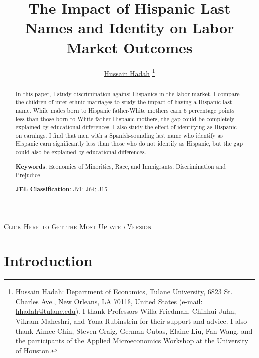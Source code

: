 \documentclass[12pt,english]{article}
\begin{document}
\title{The Impact of Hispanic Last Names and Identity on Labor Market Outcomes}

\author{\href{https://hussainhadah.com/}{Hussain Hadah} \thanks{Hussain Hadah: Department of Economics, Tulane University, 6823 St. Charles Ave., New Orleans, LA 70118, United States (e-mail: \href{mailto:hhadah@tulane.edu}{hhadah@tulane.edu}). I thank Professors Willa Friedman, Chinhui Juhn, Vikram Maheshri, and Yona Rubinstein for their support and advice. I also thank Aimee Chin, Steven Craig, German Cubas, Elaine Liu, Fan Wang, and the participants of the Applied Microeconomics Workshop at the University of Houston.}}


\maketitle

\begin{center}
\href{https://hhadah.github.io/hispanic-last-names/my_paper/Hadah-last-names-draft.pdf}{\textcolor{green!15!black!30!blue}{\footnotesize{\textsc{Click Here to Get the Most Updated Version}}}}
\end{center}

\begin{abstract}
\singlespacing In this paper, I study discrimination against Hispanics in the labor market. I compare the children of inter-ethnic marriages to study the impact of having a Hispanic last name. While males born to Hispanic father-White mothers earn 6 percentage points less than those born to White father-Hispanic mothers, the gap could be completely explained by educational differences. I also study the effect of identifying as Hispanic on earnings. I find that men with a Spanish-sounding last name who identify as Hispanic earn significantly less than those who do not identify as Hispanic, but the gap could also be explained by educational differences.

\noindent\textbf{Keywords}: Economics of Minorities, Race, and Immigrants; Discrimination and Prejudice

\noindent\textbf{JEL Classification}: J71; J64; J15

\end{abstract}


\vfill
\pagebreak{}

\section{Introduction}\label{sec:intro}
\end{document}
